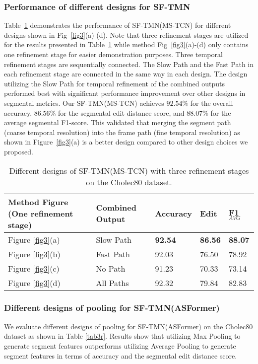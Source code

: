 \documentclass[sn-mathphys,Numbered]{sn-jnl}
\theoremstyle{thmstyleone}\newtheorem{theorem}{Theorem}\newtheorem{proposition}[theorem]{Proposition}
\theoremstyle{thmstyletwo}\newtheorem{example}{Example}\newtheorem{remark}{Remark}
\theoremstyle{thmstylethree}\newtheorem{definition}{Definition}
\begin{document}
\subsubsection{Performance of different designs for SF-TMN}
Table~\ref{tab4} demonstrates the performance of SF-TMN(MS-TCN) for different designs shown in Fig~\ref{fig3}(a)-(d). Note that three refinement stages are utilized for the results presented in Table~\ref{tab4} while method Fig~\ref{fig3}(a)-(d) only contains one refinement stage for easier demonstration purposes. Three temporal refinement stages are sequentially connected. The Slow Path and the Fast Path in each refinement stage are connected in the same way in each design. The design utilizing the Slow Path for temporal refinement of the combined outputs performed best with significant performance improvement over other designs in segmental metrics. Our SF-TMN(MS-TCN) achieves $92.54\%$ for the overall accuracy, $86.56\%$ for the segmental edit distance score, and $88.07\%$ for the average segmental F1-score. This validated that merging the segment path (coarse temporal resolution) into the frame path (fine temporal resolution) as shown in Figure~\ref{fig3}(a) is a better design compared to other design choices we proposed.

\begin{table}[h]
\centering
\caption{Different designs of SF-TMN(MS-TCN) with three refinement stages on the Cholec80 dataset.}\label{tab4}
\begin{tabular}{lllll}
\hline
Method Figure (One refinement stage) &  Combined Output & Accuracy & Edit & F1$_{AVG}$\\
\hline
Figure \ref{fig3}(a) & Slow Path & \textbf{92.54} & \textbf{86.56} & \textbf{88.07} \\
Figure \ref{fig3}(b) & Fast Path & 92.03 & 76.50 &  78.92 \\
Figure \ref{fig3}(c) & No Path & 91.23 &  70.33 & 73.14 \\
Figure \ref{fig3}(d) & All Paths & 92.32 & 79.84 & 82.83 \\

\hline
\end{tabular}
\end{table}


\subsubsection{Different designs of pooling for SF-TMN(ASFormer)}
We evaluate different designs of pooling for SF-TMN(ASFormer) on the Cholec80 dataset as shown in Table \ref{tab3r}. Results show that utilizing Max Pooling to generate segment features outperforms utilizing Average Pooling to generate segment features in terms of accuracy and the segmental edit distance score. 
\end{document}
